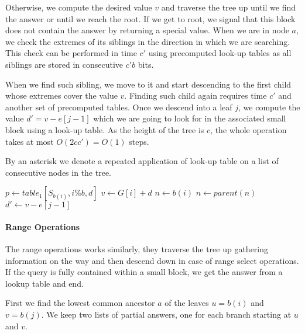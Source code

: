 Otherwise, we compute the desired value $v$ and traverse the tree up until we find the answer or until we reach the root.
If we get to root, we signal that this block does not contain the answer by returning a special value.
When we are in node $a$, we check the extremes of its siblings in the direction in which we are searching.
This check can be performed in time $c'$ using precomputed look-up tables as all siblings are stored in consecutive $c' b$ bits.

When we find such sibling, we move to it and start descending to the first child whose extremes cover the value $v$.
Finding such child again requires time $c'$ and another set of precomputed tables.
Once we descend into a leaf $j$, we compute the value $d' = v - e[j - 1]$ which we are going to look for in the associated small block using a look-up table. 
As the height of the tree is $c$, the whole operation takes at most $O(2 c c') = O(1)$ steps.

By an asterisk we denote a repeated application of look-up table on a list of consecutive nodes in the tree.

\begin{algorithmic}
	\State $p \gets table_1[S_{b(i)}, i \% b, d]$ 
		\State {}
	\Else
		\State $v \gets G[i] + d$
		\State $n \gets b(i)$ 
		 
			\State $n \gets parent(n)$
				\State {}
			\EndIf
		\EndWhile
			 
		\EndWhile
		\State $d' \gets v - e[j - 1]$
		\State {} 
	\EndIf
\EndFunction
\end{algorithmic}

\paragraph{Range Operations}

The range operations works similarly, they traverse the tree up gathering information on the way and then descend down in case of range select operations.
If the query is fully contained within a small block, we get the answer from a lookup table and end.

First we find the lowest common ancestor $a$ of the leaves $u = b(i)$ and $v = b(j)$.
We keep two lists of partial answers, one for each branch starting at $u$ and $v$.

